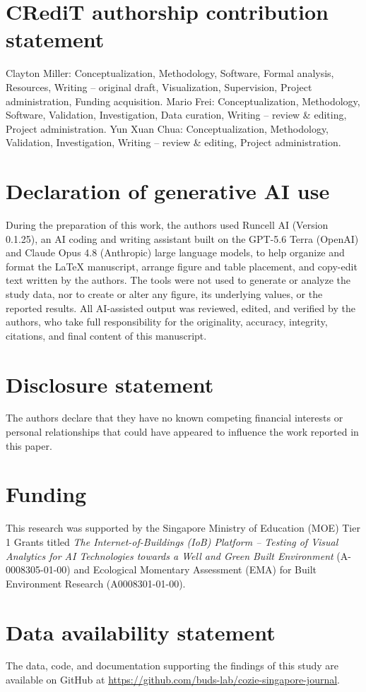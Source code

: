 \documentclass[]{interact}
\begin{document}
\section*{CRediT authorship contribution statement}
Clayton Miller: Conceptualization, Methodology, Software, Formal analysis, Resources, Writing -- original draft, Visualization, Supervision, Project administration, Funding acquisition. Mario Frei: Conceptualization, Methodology, Software, Validation, Investigation, Data curation, Writing -- review \& editing, Project administration. Yun Xuan Chua: Conceptualization, Methodology, Validation, Investigation, Writing -- review \& editing, Project administration. 

\section*{Declaration of generative AI use}
During the preparation of this work, the authors used Runcell AI (Version 0.1.25), an AI coding and writing assistant built on the GPT-5.6 Terra (OpenAI) and Claude Opus 4.8 (Anthropic) large language models, to help organize and format the \LaTeX{} manuscript, arrange figure and table placement, and copy-edit text written by the authors. The tools were not used to generate or analyze the study data, nor to create or alter any figure, its underlying values, or the reported results. All AI-assisted output was reviewed, edited, and verified by the authors, who take full responsibility for the originality, accuracy, integrity, citations, and final content of this manuscript. 

\section*{Disclosure statement}
The authors declare that they have no known competing financial interests or personal relationships that could have appeared to influence the work reported in this paper.

\section*{Funding}
This research was supported by the Singapore Ministry of Education (MOE) Tier 1 Grants titled \textit{The Internet-of-Buildings (IoB) Platform -- Testing of Visual Analytics for AI Technologies towards a Well and Green Built Environment} (A-0008305-01-00) and Ecological Momentary Assessment (EMA) for Built Environment Research (A0008301-01-00).

\section*{Data availability statement}
The data, code, and documentation supporting the findings of this study are available on GitHub at \url{https://github.com/buds-lab/cozie-singapore-journal}. 


\end{document}
